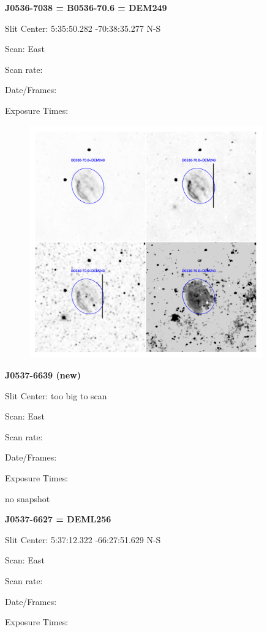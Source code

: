 \documentclass[11pt]{article}
\begin{document}
\newpage
{\bf J0536-7038 = B0536-70.6 = DEM249}  
 
Slit Center:   5:35:50.282   -70:38:35.277 N-S

Scan:  East

Scan rate:  

Date/Frames:

Exposure Times:  

\begin{figure}
\includegraphics[width=10.05cm]{snapshots/B0536-706.png}
\end{figure}


\newpage
{\bf J0537-6639 (new)}  
 
Slit Center:   too big to scan

Scan:  East

Scan rate:  

Date/Frames:

Exposure Times:  

no snapshot
\begin{figure}
\end{figure}

\newpage
{\bf J0537-6627 = DEML256}  
 
Slit Center:  5:37:12.322  -66:27:51.629 N-S

Scan:  East

Scan rate:  

Date/Frames:

Exposure Times:  
\end{document}
